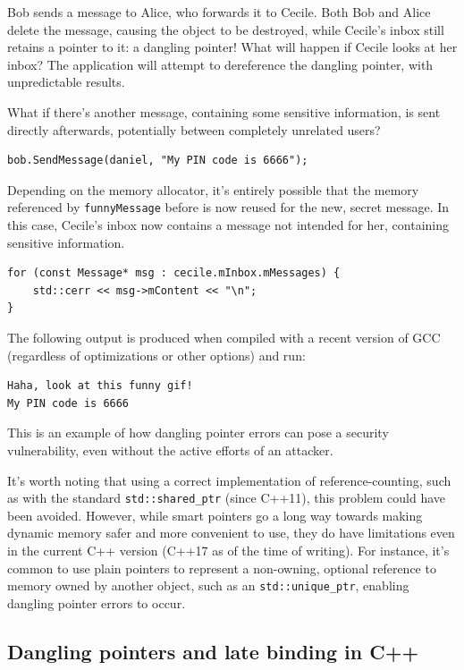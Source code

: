 Bob sends a message to Alice, who forwards it to Cecile. Both Bob and Alice delete the message, causing the object to be destroyed, while Cecile's inbox still retains a pointer to it: a dangling pointer! What will happen if Cecile looks at her inbox? The application will attempt to dereference the dangling pointer, with unpredictable results.

What if there's another message, containing some sensitive information, is sent directly afterwards, potentially between completely unrelated users?

\begin{lstlisting}
bob.SendMessage(daniel, "My PIN code is 6666");
\end{lstlisting}

Depending on the memory allocator, it's entirely possible that the memory referenced by \lstinline!funnyMessage! before is now reused for the new, secret message. In this case, Cecile's inbox now contains a message not intended for her, containing sensitive information.

\begin{lstlisting}
for (const Message* msg : cecile.mInbox.mMessages) {
	std::cerr << msg->mContent << "\n";
}
\end{lstlisting}

The following output is produced when compiled with a recent version of GCC (regardless of optimizations or other options) and run:

\begin{verbatim}
Haha, look at this funny gif!	
My PIN code is 6666
\end{verbatim}

This is an example of how dangling pointer errors can pose a security vulnerability, even without the active efforts of an attacker.

It's worth noting that using a correct implementation of reference-counting, such as with the standard \lstinline!std::shared_ptr! (since C++11), this problem could have been avoided. However, while smart pointers go a long way towards making dynamic memory safer and more convenient to use, they do have limitations even in the current C++ version (C++17 as of the time of writing). For instance, it's common to use plain pointers to represent a non-owning, optional reference to memory owned by another object, such as an \lstinline!std::unique_ptr!, enabling dangling pointer errors to occur.

\subsection{Dangling pointers and late binding in C++}

